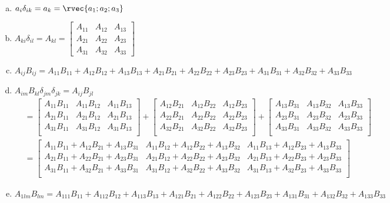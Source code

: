 \documentclass[a4paper,twosided,11pt,DIV15]{scrartcl}
\begin{document}
\begin{enumerate}[(a)]
\item $a_i\delta_{ik} = a_k = \rvec{a_1;a_2;a_3}$
\item $A_{ki}\delta_{il} = A_{kl} = \begin{bmatrix}A_{11}&A_{12}&A_{13}\\A_{21}&A_{22}&A_{23}\\A_{31}&A_{32}&A_{33}\end{bmatrix}$
\item $A_{ij}B_{ij} = A_{11}B_{11}+A_{12}B_{12}+A_{13}B_{13}+A_{21}B_{21}+A_{22}B_{22}+A_{23}B_{23}+A_{31}B_{31}+A_{32}B_{32}+A_{33}B_{33} $
\item $A_{im}B_{kl}\delta_{jm}\delta_{jk} = A_{ij}B_{jl}$\\
\begin{align*}
&=
\begin{bmatrix}
A_{11}B_{11}  & A_{11}B_{12}  & A_{11}B_{13} \\
A_{21}B_{11}  & A_{21}B_{12}  & A_{21}B_{13} \\
A_{31}B_{11}  & A_{31}B_{12}  & A_{31}B_{13} \\
\end{bmatrix}+
\begin{bmatrix}
A_{12}B_{21}  & A_{12}B_{22}  & A_{12}B_{23} \\
A_{22}B_{21}  & A_{22}B_{22}  & A_{22}B_{23} \\
A_{32}B_{21}  & A_{32}B_{22}  & A_{32}B_{23} \\
\end{bmatrix}+
\begin{bmatrix}
A_{13}B_{31}  & A_{13}B_{32}  & A_{13}B_{33} \\
A_{23}B_{31}  & A_{23}B_{32}  & A_{23}B_{33} \\
A_{33}B_{31}  & A_{33}B_{32}  & A_{33}B_{33} \\
\end{bmatrix}\\
&=
\begin{bmatrix}
A_{11}B_{11}  + A_{12}B_{21}  + A_{13}B_{31}  & A_{11}B_{12}  + A_{12}B_{22}  + A_{13}B_{32}  & A_{11}B_{13}  + A_{12}B_{23}  + A_{13}B_{33} \\
A_{21}B_{11}  + A_{22}B_{21}  + A_{23}B_{31}  & A_{21}B_{12}  + A_{22}B_{22}  + A_{23}B_{32}  & A_{21}B_{13}  + A_{22}B_{23}  + A_{23}B_{33} \\
A_{31}B_{11}  + A_{32}B_{21}  + A_{33}B_{31}  & A_{31}B_{12}  + A_{32}B_{22}  + A_{33}B_{32}  & A_{31}B_{13}  + A_{32}B_{23}  + A_{33}B_{33} \\
\end{bmatrix}
\end{align*}

\item $A_{1lm}B_{lm} = A_{111}B_{11}+A_{112}B_{12}+A_{113}B_{13}+A_{121}B_{21}+A_{122}B_{22}+A_{123}B_{23}+A_{131}B_{31}+A_{132}B_{32}+A_{133}B_{33}$
\end{enumerate}
\end{document}
